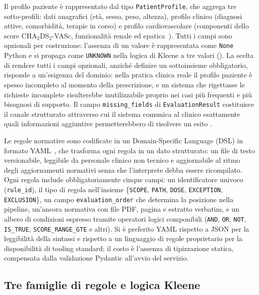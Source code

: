 Il profilo paziente è rappresentato dal tipo \texttt{PatientProfile},
che aggrega tre sotto-profili: dati anagrafici (età, sesso, peso, altezza),
profilo clinico (diagnosi attive, comorbidità, terapie in corso) e profilo
cardiovascolare (componenti dello score CHA$_2$DS$_2$-VASc, funzionalità
renale ed epatica~\cite{lip2010cha2ds2vasc}).
Tutti i campi sono opzionali per costruzione: l'assenza di un valore è
rappresentata come \texttt{None} Python e si propaga come \texttt{UNKNOWN}
nella logica di Kleene a tre valori ().
La scelta di rendere tutti i campi opzionali, anziché definire un sottoinsieme
obbligatorio, risponde a un'esigenza del dominio: nella pratica clinica reale
il profilo paziente è spesso incompleto al momento della prescrizione, e
un sistema che rigettasse le richieste incomplete risulterebbe inutilizzabile
proprio nei casi più frequenti e più bisognosi di supporto.
Il campo \texttt{missing\_fields} di \texttt{EvaluationResult} costituisce
il canale strutturato attraverso cui il sistema comunica al clinico
esattamente quali informazioni aggiuntive permetterebbero di risolvere
un esito .

Le regole normative sono codificate in un Domain-Specific Language (DSL)
in formato YAML~\cite{yamlspec}, che trasforma ogni regola in un dato
strutturato: un file di testo versionabile, leggibile da personale clinico
non tecnico e aggiornabile al ritmo degli aggiornamenti normativi senza
che l'interprete debba essere ricompilato.
Ogni regola include obbligatoriamente cinque campi: un identificatore univoco
(\texttt{rule\_id}), il tipo di regola nell'insieme
\{\texttt{SCOPE}, \texttt{PATH}, \texttt{DOSE}, \texttt{EXCEPTION},
\texttt{EXCLUSION}\}, un campo \texttt{evaluation\_order} che determina
la posizione nella pipeline, un'ancora normativa con file PDF, pagina
e estratto verbatim, e un albero di condizioni espresso tramite operatori
logici componibili (\texttt{AND}, \texttt{OR}, \texttt{NOT}, \texttt{IS\_TRUE},
\texttt{SCORE\_RANGE\_GTE} e altri).
Si è preferito YAML rispetto a JSON per la leggibilità della sintassi e
rispetto a un linguaggio di regole proprietario per la disponibilità di
tooling standard; il costo è l'assenza di tipizzazione statica,
compensata dalla validazione Pydantic all'avvio del servizio.

\subsection{Tre famiglie di regole e logica Kleene}
\label{subsec:famiglie-regole}

